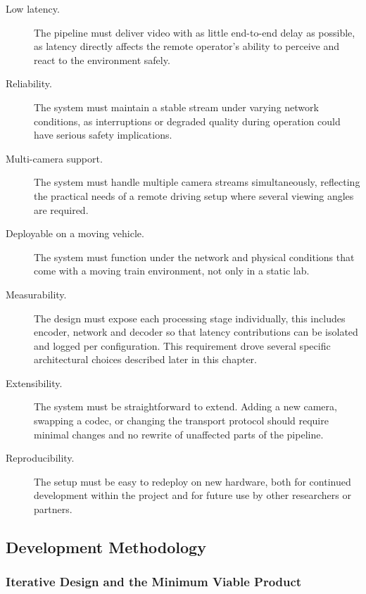\begin{description}
  \item[Low latency.] The pipeline must deliver video with as little end-to-end delay as possible, as latency directly affects the remote operator's ability to perceive and react to the environment safely.

  \item[Reliability.] The system must maintain a stable stream under varying network conditions, as interruptions or degraded quality during operation could have serious safety implications.

  \item[Multi-camera support.] The system must handle multiple camera streams simultaneously, reflecting the practical needs of a remote driving setup where several viewing angles are required.

  \item[Deployable on a moving vehicle.] The system must function under the network and physical conditions that come with a moving train environment, not only in a static lab.

  \item[Measurability.] The design must expose each processing stage individually, this includes encoder, network and decoder so that latency contributions can be isolated and logged per configuration. This requirement drove several specific architectural choices described later in this chapter.

  \item[Extensibility.] The system must be straightforward to extend. Adding a new camera, swapping a codec, or changing the transport protocol should require minimal changes and no rewrite of unaffected parts of the pipeline.

  \item[Reproducibility.] The setup must be easy to redeploy on new hardware, both for continued development within the project and for future use by other researchers or partners.
\end{description}


\subsection{Development Methodology}

\subsubsection{Iterative Design and the Minimum Viable Product}

